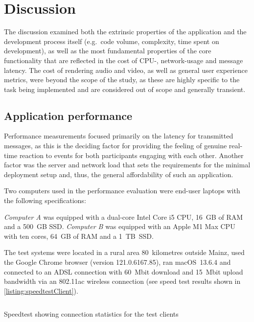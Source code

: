\chapter{Discussion}
\label{ch:discussion}

The discussion examined both the extrinsic properties of the application and the development process itself (e.g.\ code volume, complexity, time spent on development), as well as the most fundamental properties of the core functionality that are reflected in the cost of \ac{CPU}-, network-usage and message latency.
The cost of rendering audio and video, as well as general user experience metrics, were beyond the scope of the study, as these are highly specific to the task being implemented and are considered out of scope and generally transient.

\section{Application performance}
\label{sec:statistics}

Performance measurements focused primarily on the latency for transmitted messages, as this is the deciding factor for providing the feeling of genuine real-time reaction to events for both participants engaging with each other.
Another factor was the server and network load that sets the requirements for the minimal deployment setup and, thus, the general affordability of such an application.

Two computers used in the performance evaluation were end-user laptops with the following specifications:

\emph{Computer A} was equipped with a dual-core Intel Core i5 \ac{CPU}, 16~\ac{GB} of \ac{RAM} and a 500~\ac{GB} \ac{SSD}.
\emph{Computer B} was equipped with an Apple M1 Max \ac{CPU} with ten cores, 64~\ac{GB} of \ac{RAM} and a 1~\ac{TB}~\ac{SSD}.

The test systems were located in a rural area 80~kilometres outside Mainz, used the Google Chrome browser (version 121.0.6167.85), ran macOS~13.6.4 and connected to an \ac{ADSL} connection with 60~\ac{Mbit} download and 15~\ac{Mbit} upload bandwidth via an 802.11ac wireless connection (see speed test results shown in \autoref{listing:speedtestClient}).

\begin{listing}[!ht]
\inputminted{text}{04_Artefakte/03_Listings/speedtest-client.txt}
\caption{Speedtest showing connection statistics for the test clients\protect}
\label{listing:speedtestClient}
\end{listing}

